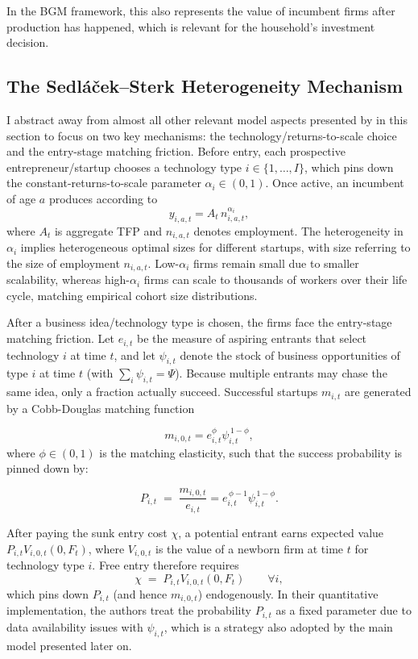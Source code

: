 \documentclass[a4paper,12pt]{article} %
\numberwithin{equation}{section} %
\numberwithin{figure}{section}
\numberwithin{table}{section}
\begin{document}
In the BGM framework, this also represents the value of incumbent firms after production has happened, which is relevant for the household's investment decision.



\subsection{The Sedláček–Sterk Heterogeneity Mechanism}
\label{sec:model-sedlacek}

I abstract away from almost all other relevant model aspects presented by \textcite{sedlavcek2017growth} 
in this section to focus on two key mechanisms: the technology/returns-to-scale choice and the entry-stage 
matching friction. Before entry, each prospective entrepreneur/startup chooses a technology type $i\in\{1,\dots,I\}$,
which pins down the constant-returns-to-scale parameter $\alpha_i\in(0,1)$. Once active, an incumbent of age $a$ 
produces according to 
\[
y_{i,a,t}=A_t\,n_{i,a,t}^{\alpha_i},
\]
where $A_t$ is aggregate TFP and $n_{i,a,t}$ denotes employment. The heterogeneity in $\alpha_i$ implies 
heterogeneous optimal sizes for different startups, with size referring to the size of employment $n_{i,a,t}$. Low-$\alpha_i$ firms remain small due to smaller scalability, whereas high-$\alpha_i$ firms can scale 
to thousands of workers over their life cycle, matching empirical cohort size distributions. 

After a business idea/technology type is chosen, the firms face the entry-stage matching friction. Let $e_{i,t}$ be
the measure of aspiring entrants that select technology $i$ at time $t$, and let $\psi_{i,t}$ denote the stock 
of business opportunities of type $i$ at time $t$ (with $\sum_i\psi_{i,t}=\Psi$). Because multiple entrants may chase the same idea, only
a fraction actually succeed. Successful startups $m_{i,t}$ are generated by a Cobb-Douglas matching function

\[
m_{i,0,t}=e_{i,t}^{\phi}\psi_{i,t}^{\,1-\phi},
\]
where $\phi\in(0,1)$ is the matching elasticity, such that the success probability is pinned down by:

\[
P_{i,t}\;=\;\frac{m_{i,0,t}}{e_{i,t}}=e_{i,t}^{\,\phi-1}\psi_{i,t}^{\,1-\phi}.
\]

After paying the sunk entry cost $\chi$, a potential entrant earns expected value
$P_{i,t}V_{i,0,t}(0,F_t)$, where $V_{i,0,t}$ is the value of a newborn firm at time $t$ for technology type $i$.
Free entry therefore requires
\[
\chi \;=\;P_{i,t}V_{i,0,t}(0,F_t)\qquad\forall i,  \tag{FE}
\]
which pins down $P_{i,t}$ (and hence $m_{i,0,t}$) endogenously. In their quantitative implementation, the authors treat the 
probability $P_{i,t}$ as a fixed parameter due to data availability issues with $\psi_{i,t}$, which is a strategy also adopted
by the main model presented later on.
\end{document}
